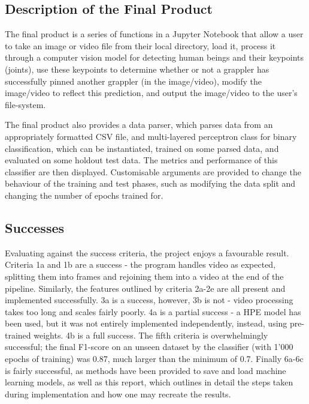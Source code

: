 \documentclass[a4paper, oneside, 11pt]{article}
\begin{document}
\subsection{Description of the Final Product}

The final product is a series of functions in a Jupyter Notebook that allow a user to take an image or video file from their local directory, load it, process it through a computer vision model for detecting human beings and their keypoints (joints), use these keypoints to determine whether or not a grappler has successfully pinned another grappler (in the image/video), modify the image/video to reflect this prediction, and output the image/video to the user's file-system.

\bigskip
\noindent
The final product also provides a data parser, which parses data from an appropriately formatted CSV file, and multi-layered perceptron class for binary classification, which can be instantiated, trained on some parsed data, and evaluated on some holdout test data. The metrics and performance of this classifier are then displayed. Customisable arguments are provided to change the behaviour of the training and test phases, such as modifying the data split and changing the number of epochs trained for.

\subsection{Successes}

Evaluating against the success criteria, the project enjoys a favourable result. Criteria 1a and 1b are a success - the program handles video as expected, splitting them into frames and rejoining them into a video at the end of the pipeline. Similarly, the features outlined by criteria 2a-2e are all present and implemented successfully. 3a is a success, however, 3b is not - video processing takes too long and scales fairly poorly. 4a is a partial success - a HPE model has been used, but it was not entirely implemented independently, instead, using pre-trained weights. 4b is a full success. The fifth criteria is overwhelmingly successful; the final F1-score on an unseen dataset by the classifier (with 1'000 epochs of training) was 0.87, much larger than the minimum of 0.7. Finally 6a-6c is fairly successful, as methods have been provided to save and load machine learning models, as well as this report, which outlines in detail the steps taken during implementation and how one may recreate the results.
\end{document}
